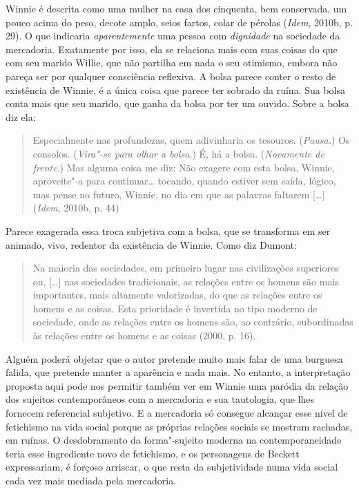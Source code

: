 Winnie é descrita como uma mulher na casa dos cinquenta, bem conservada,
um pouco acima do peso, decote amplo, seios fartos, colar de pérolas
(\emph{Idem}, 2010b, p. 29). O que indicaria \emph{aparentemente} uma
pessoa com \emph{dignidade} na sociedade da mercadoria. Exatamente por
isso, ela se relaciona mais com suas coisas do que com seu marido
Willie, que não partilha em nada o seu otimismo, embora não pareça ser
por qualquer consciência reflexiva. A bolsa parece conter o resto de
existência de Winnie, é a única coisa que parece ter sobrado da ruína.
Sua bolsa conta mais que seu marido, que ganha da bolsa por ter um
ouvido. Sobre a bolsa diz ela:

\begin{quote}
Especialmente nas profundezas, quem adivinharia os tesouros.
(\emph{Pausa.}) Os consolos. (\emph{Vira"-se para olhar a bolsa}.) É, há
a bolsa. (\emph{Novamente de frente}.) Mas alguma coisa me diz: Não
exagere com esta bolsa, Winnie, aproveite"-a para continuar\ldots{} tocando,
quando estiver sem saída, lógico, mas pense no futuro, Winnie, no dia em
que as palavras faltarem [\ldots{}] (\emph{Idem}, 2010b, p. 44)
\end{quote}

Parece exagerada essa troca subjetiva com a bolsa, que se transforma em
ser animado, vivo, redentor da existência de Winnie. Como diz Dumont:

\begin{quote}
Na maioria das sociedades, em primeiro lugar nas civilizações superiores
ou, [\ldots{}] nas sociedades tradicionais, as relações entre os homens
são mais importantes, mais altamente valorizadas, do que as relações
entre os homens e as coisas. Esta prioridade é invertida no tipo moderno
de sociedade, onde as relações entre os homens são, ao contrário,
subordinadas às relações entre os homens e as coisas (2000, p. 16).
\end{quote}

Alguém poderá objetar que o autor pretende muito mais falar de uma
burguesa falida, que pretende manter a aparência e nada mais. No
entanto, a interpretação proposta aqui pode nos permitir também ver em Winnie uma
paródia da relação dos sujeitos contemporâneos com a mercadoria e sua
tautologia, que lhes fornecem referencial subjetivo. E a mercadoria só
consegue alcançar esse nível de fetichismo na vida social porque as
próprias relações sociais se mostram rachadas, em ruínas. O
desdobramento da forma"-sujeito moderna na contemporaneidade teria esse
ingrediente novo de fetichismo, e os personagens de Beckett
expressariam, é forçoso arriscar, o que resta da subjetividade numa vida
social cada vez mais mediada pela mercadoria.

